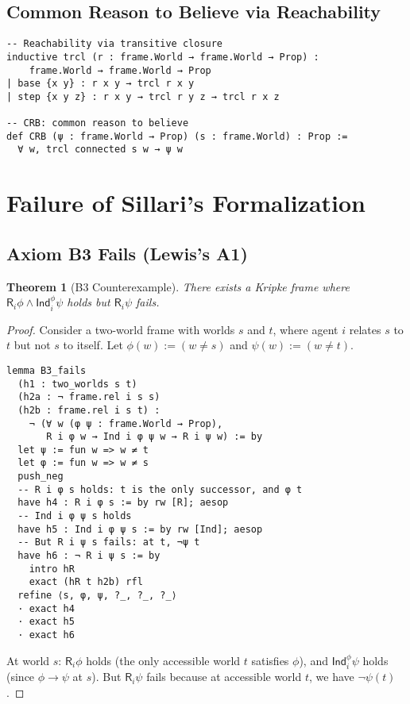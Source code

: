 \documentclass[11pt]{article}
\newtheorem{theorem}{Theorem}
\newcommand{\Roperator}{\mathsf{R}}
\newcommand{\Ind}{\mathsf{Ind}}
\begin{document}
\subsection{Common Reason to Believe via Reachability}

\begin{verbatim}
-- Reachability via transitive closure
inductive trcl (r : frame.World → frame.World → Prop) : 
    frame.World → frame.World → Prop
| base {x y} : r x y → trcl r x y
| step {x y z} : r x y → trcl r y z → trcl r x z

-- CRB: common reason to believe
def CRB (ψ : frame.World → Prop) (s : frame.World) : Prop :=
  ∀ w, trcl connected s w → ψ w
\end{verbatim}

\section{Failure of Sillari's Formalization}

\subsection{Axiom B3 Fails (Lewis's A1)}

\begin{theorem}[B3 Counterexample]
There exists a Kripke frame where $\Roperator_i \phi \land \Ind_i^\phi \psi$ 
holds but $\Roperator_i \psi$ fails.
\end{theorem}

\begin{proof}
Consider a two-world frame with worlds $s$ and $t$, where agent $i$ relates 
$s$ to $t$ but not $s$ to itself. Let $\phi(w) := (w \neq s)$ and 
$\psi(w) := (w \neq t)$.

\begin{verbatim}
lemma B3_fails
  (h1 : two_worlds s t)
  (h2a : ¬ frame.rel i s s)
  (h2b : frame.rel i s t) :
    ¬ (∀ w (φ ψ : frame.World → Prop), 
       R i φ w → Ind i φ ψ w → R i ψ w) := by
  let ψ := fun w => w ≠ t
  let φ := fun w => w ≠ s
  push_neg
  -- R i φ s holds: t is the only successor, and φ t
  have h4 : R i φ s := by rw [R]; aesop
  -- Ind i φ ψ s holds
  have h5 : Ind i φ ψ s := by rw [Ind]; aesop
  -- But R i ψ s fails: at t, ¬ψ t
  have h6 : ¬ R i ψ s := by
    intro hR
    exact (hR t h2b) rfl
  refine ⟨s, φ, ψ, ?_, ?_, ?_⟩
  · exact h4
  · exact h5  
  · exact h6
\end{verbatim}

At world $s$: $\Roperator_i \phi$ holds (the only accessible world $t$ satisfies 
$\phi$), and $\Ind_i^\phi \psi$ holds (since $\phi \to \psi$ at $s$). But 
$\Roperator_i \psi$ fails because at accessible world $t$, we have $\neg\psi(t)$.
\end{proof}
\end{document}
